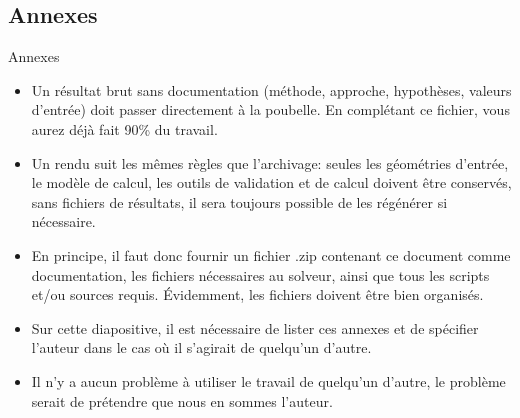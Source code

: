 \subsection{Annexes}
\label{sec:Annexes}

\begin{frame}[c]{Annexes}
    \begin{itemize}
        \item Un résultat brut sans documentation (méthode, approche, hypothèses, valeurs d’entrée) doit passer directement à la poubelle. En complétant ce fichier, vous aurez déjà fait 90\% du travail.
        \item Un rendu suit les mêmes règles que l'archivage: seules les géométries d'entrée, le modèle de calcul, les outils de validation et de calcul doivent être conservés, sans fichiers de résultats, il sera toujours possible de les régénérer si nécessaire.
        \item En principe, il faut donc fournir un fichier .zip contenant ce document comme documentation, les fichiers nécessaires au solveur, ainsi que tous les scripts et/ou sources requis. Évidemment, les fichiers doivent être bien organisés.
        \item Sur cette diapositive, il est nécessaire de lister ces annexes et de spécifier l'auteur dans le cas où il s'agirait de quelqu'un d'autre. 
        \item Il n'y a aucun problème à utiliser le travail de quelqu'un d'autre, le problème serait de prétendre que nous en sommes l'auteur.
    \end{itemize}
\end{frame}
